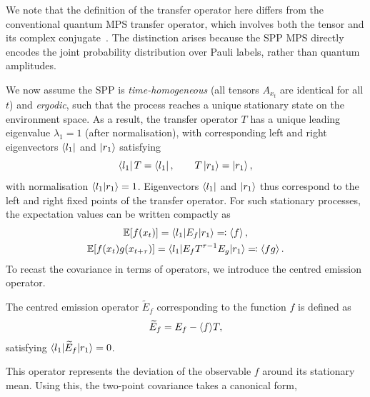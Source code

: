 We note that the definition of the transfer operator here differs from the conventional quantum MPS transfer operator, which involves both the tensor and its complex conjugate~\cite{schollwockDensitymatrixRenormalizationGroup2005}. The distinction arises because the SPP MPS directly encodes the joint probability distribution over Pauli labels, rather than quantum amplitudes.

We now assume the SPP is \emph{time-homogeneous} (all tensors \(A_{x_t}\) are identical for all \(t\)) and \emph{ergodic}, such that the process reaches a unique stationary state on the environment space. As a result, the transfer operator \(T\) has a unique leading eigenvalue \(\lambda_1 = 1\) (after normalisation), with corresponding left and right eigenvectors \(\bra{l_1}\) and \(\ket{r_1}\) satisfying
\begin{equation}
    \bra{l_1} T = \bra{l_1},
    \qquad
    T \ket{r_1} = \ket{r_1},
\end{equation}
with normalisation \(\braket{l_1|r_1} = 1\). Eigenvectors \(\bra{l_1}\) and \(\ket{r_1}\) thus correspond to the left and right fixed points of the transfer operator. For such stationary processes, the expectation values can be written compactly as
\begin{equation}\label{eq:expectation-values-operator}
    \begin{gathered}
        \mathbb{E}[f(x_t)] = \braket{l_1|E_f|r_1} \eqcolon \braket{f}, \\
        \mathbb{E}[f(x_t)g(x_{t+\tau})] = \braket{l_1|E_f T^{\tau - 1} E_g|r_1} \eqcolon \braket{fg}.
    \end{gathered}
\end{equation}
To recast the covariance in terms of operators, we introduce the centred emission operator.
\begin{definition}
    The centred emission operator \(\widetilde{E}_f\) corresponding to the function \(f\) is defined as
    \begin{equation}
        \widetilde{E}_f = E_f - \braket{f}\!T,
    \end{equation}
    satisfying \(\braket{l_1|\widetilde{E}_f|r_1} = 0\).
\end{definition}
This operator represents the deviation of the observable \(f\) around its stationary mean. Using this, the two-point covariance takes a canonical form,
